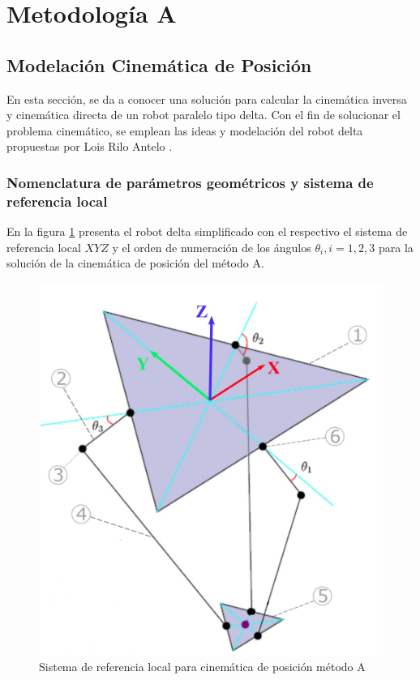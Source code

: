      \newpage
     

\section{Metodología A}

    \subsection{Modelación Cinemática de Posición}
    
        En esta sección, se da a conocer una solución para calcular la cinemática inversa y cinemática directa de un robot paralelo tipo delta. Con el fin de solucionar el problema cinemático, se emplean las ideas y modelación del robot delta propuestas por Lois Rilo Antelo \cite{Diseno_e_implementacion_de_un_sistema_de_control_para_la_representacion_grafica_a_partir_de_imagenes}.
        
        \subsubsection{Nomenclatura de parámetros geométricos y sistema de referencia local}
        En la figura  \ref{f:Cap4_Metodo_A_Modelacion_Cinematica_Posicion_1}  presenta el robot delta simplificado con el respectivo el sistema de referencia local $XYZ$ y el orden de numeración de los ángulos $\theta_i , i=1,2,3$ para la solución de la cinemática de posición del método A.
        
        \begin{figure}[htb]
             \centering
             \includegraphics[width=0.45\linewidth]{Main/Chapter4/Images4/DIBUJO2.jpg}
              \caption{Sistema de referencia local para cinemática de posición método A}
              \label{f:Cap4_Metodo_A_Modelacion_Cinematica_Posicion_1}
        \end{figure}

